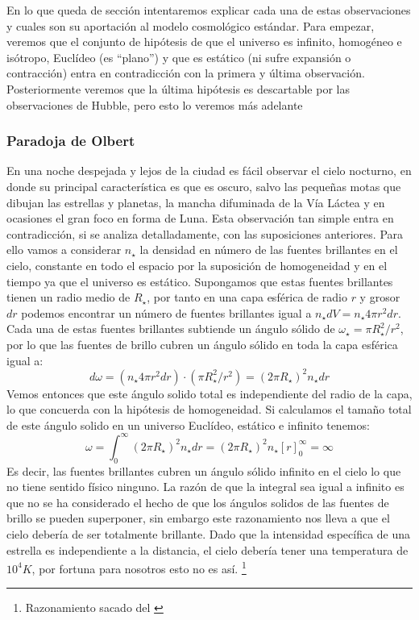 En lo que queda de sección intentaremos explicar cada una de estas observaciones y cuales son su aportación al modelo cosmológico estándar. Para empezar, veremos que el conjunto de hipótesis de que el universo es infinito, homogéneo e isótropo, Euclídeo (es ``plano'') y que es estático (ni sufre expansión o contracción) entra en contradicción con la primera y última observación. Posteriormente veremos que la última hipótesis es descartable por las observaciones de Hubble, pero esto lo veremos más adelante

\subsubsection{Paradoja de Olbert}
En una noche despejada y lejos de la ciudad es fácil observar el cielo nocturno, en donde su principal característica es que es oscuro, salvo las pequeñas motas que dibujan las estrellas y planetas, la mancha difuminada de la Vía Láctea y en ocasiones el gran foco en forma de Luna. Esta observación tan simple entra en contradicción, si se analiza detalladamente, con las suposiciones anteriores. Para ello vamos a considerar $n_\star$ la densidad en número de las fuentes brillantes en el cielo, constante en todo el espacio por la suposición de homogeneidad y en el tiempo ya que el universo es estático. Supongamos que estas fuentes brillantes tienen un radio medio de $R_\star$, por tanto en una capa esférica de radio $r$ y grosor $dr$ podemos encontrar un número de fuentes brillantes igual a $n_\star dV=n_\star 4\pi r^2 dr$. Cada una de estas fuentes brillantes subtiende un ángulo sólido de $\omega_\star=\pi R_\star^2/r^2$, por lo que las fuentes de brillo cubren un ángulo sólido en toda la capa esférica igual a:
\begin{equation}
d\omega=(n_\star 4\pi r^2 dr)\cdot (\pi R_\star^2/r^2)=(2\pi R_\star)^2 n_\star dr
\end{equation}
Vemos entonces que este ángulo solido total es independiente del radio de la capa, lo que concuerda con la hipótesis de homogeneidad. Si calculamos el tamaño total de este ángulo solido en un universo Euclídeo, estático e infinito tenemos:
\begin{equation}
\omega=\int_0^\infty (2\pi R_\star)^2 n_\star dr=(2\pi R_\star)^2 n_\star \left[r\right]_0^\infty=\infty
\end{equation}
Es decir, las fuentes brillantes cubren un ángulo sólido infinito en el cielo lo que no tiene sentido físico ninguno. La razón de que la integral sea igual a infinito es que no se ha considerado el hecho de que los ángulos solidos de las fuentes de brillo se pueden superponer, sin embargo este razonamiento nos lleva a que el cielo debería de ser totalmente brillante. Dado que la intensidad específica de una estrella es independiente a la distancia, el cielo debería tener una temperatura de $10^4K$, por fortuna para nosotros esto no es así. \footnote{Razonamiento sacado del \cite{schneider2006extragalactic}}
